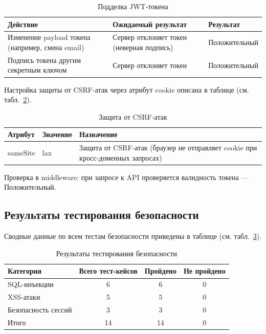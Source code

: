\begin{table}[H]
\caption{\label{tab:secJwtForgery}Подделка JWT-токена}
\small
\begin{center}
\vspace{-0.5cm}\begin{tabular}{|p{6cm}|p{6cm}|p{3cm}|}
\hline
Действие & Ожидаемый результат & Результат \\ \hline
Изменение payload токена (например, смена email) & Сервер отклоняет токен (неверная подпись) & Положительный \\ \hline
Подпись токена другим секретным ключом & Сервер отклоняет токен & Положительный \\ \hline
\end{tabular}
\end{center}
\end{table}

Настройка защиты от CSRF-атак через атрибут cookie описана в таблице (см. табл.~\ref{tab:secCsrf}).

\begin{table}[H]
\caption{\label{tab:secCsrf}Защита от CSRF-атак}
\small
\begin{center}
\vspace{-0.5cm}\begin{tabular}{|p{2cm}|p{2cm}|p{11cm}|}
\hline
Атрибут & Значение & Назначение \\ \hline
sameSite & lax & Защита от CSRF-атак (браузер не отправляет cookie при кросс-доменных запросах) \\ \hline
\end{tabular}
\end{center}
\end{table}

Проверка в middleware: при запросе к API проверяется валидность токена — Положительный.

\subsection{Результаты тестирования безопасности}
Сводные данные по всем тестам безопасности приведены в таблице (см. табл.~\ref{tab:secResults}).

\begin{table}[H]
\caption{\label{tab:secResults}Результаты тестирования безопасности}
\small
\begin{center}
\vspace{-0.5cm}\begin{tabular}{|l|c|c|c|}
\hline
Категория & Всего тест-кейсов & Пройдено & Не пройдено \\ \hline
SQL-инъекции & 6 & 6 & 0 \\ \hline
XSS-атаки & 5 & 5 & 0 \\ \hline
Безопасность сессий & 3 & 3 & 0 \\ \hline
Итого & 14 & 14 & 0 \\ \hline
\end{tabular}
\end{center}
\end{table}


